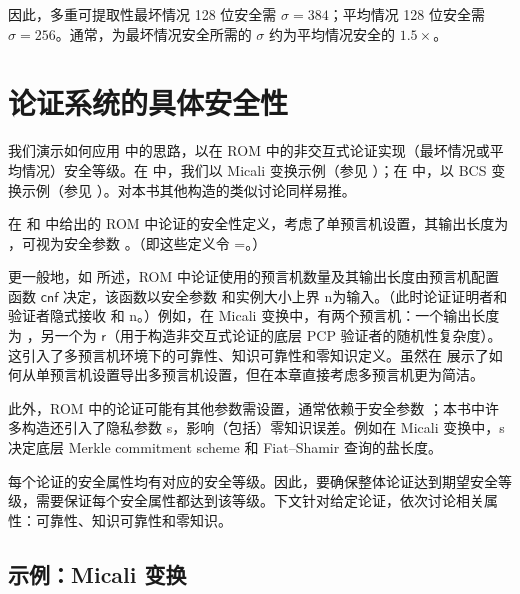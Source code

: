 \documentclass[american,singlepageview]{snargs-book-zh}
\newcommand{\InstanceSize}{n}
\newcommand{\ProtoRandomnessComplexity}{\mathsf{r}}
\newcommand{\PCPRandomnessComplexity}{\ProtoRandomnessComplexity}
\newcommand{\ARGOracles}{\mathsf{cnf}}
\newcommand{\SecurityParameter}{\lambda}
\newcommand{\PrivacyParameter}{s}
\newcommand{\ROOutputSize}{\sigma}
\begin{document}
因此，多重可提取性最坏情况 128 位安全需 $\ROOutputSize=384$；平均情况 128 位安全需 $\ROOutputSize=256$。通常，为最坏情况安全所需的 $\ROOutputSize$ 约为平均情况安全的 $1.5\times$。

\section{论证系统的具体安全性}
\label{section:concrete-security-for-argument-systems}

我们演示如何应用  中的思路，以在 ROM 中的非交互式论证实现（最坏情况或平均情况）安全等级。在  中，我们以 Micali 变换示例（参见 ）；在  中，以 BCS 变换示例（参见 ）。对本书其他构造的类似讨论同样易推。

在  和  中给出的 ROM 中论证的安全性定义，考虑了单预言机设置，其输出长度为 \ROOutputSize，可视为安全参数 \SecurityParameter。（即这些定义令 \SecurityParameter=\ROOutputSize。）

更一般地，如  所述，ROM 中论证使用的预言机数量及其输出长度由预言机配置函数 $\ARGOracles$ 决定，该函数以安全参数 \SecurityParameter 和实例大小上界 \InstanceSize 为输入。（此时论证证明者和验证者隐式接收 \SecurityParameter 和 \InstanceSize。）例如，在 Micali 变换中，有两个预言机：一个输出长度为 \SecurityParameter，另一个为 $\PCPRandomnessComplexity$（用于构造非交互式论证的底层 PCP 验证者的随机性复杂度）。这引入了多预言机环境下的可靠性、知识可靠性和零知识定义。虽然在  展示了如何从单预言机设置导出多预言机设置，但在本章直接考虑多预言机更为简洁。

此外，ROM 中的论证可能有其他参数需设置，通常依赖于安全参数 \SecurityParameter；本书中许多构造还引入了隐私参数 \PrivacyParameter，影响（包括）零知识误差。例如在 Micali 变换中，\PrivacyParameter 决定底层 Merkle commitment scheme 和 Fiat--Shamir 查询的盐长度。

每个论证的安全属性均有对应的安全等级。因此，要确保整体论证达到期望安全等级，需要保证每个安全属性都达到该等级。下文针对给定论证，依次讨论相关属性：可靠性、知识可靠性和零知识。

\subsection{示例：Micali 变换}
\label{section:concrete-security-for-micali}
\end{document}

